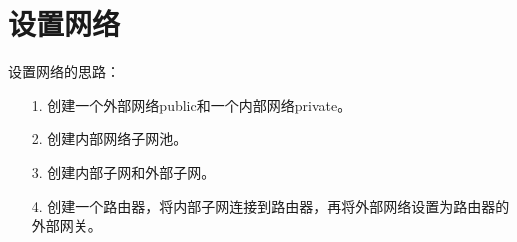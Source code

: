 \documentclass[a4paper,left=1.5cm,right=1.5cm,11pt]{article}
\begin{document}
\tableofcontents

\clearpage

\section{设置网络}

	设置网络的思路：
	\begin{itemize}
		\item[1.] 创建一个外部网络public和一个内部网络private。
		\item[2.] 创建内部网络子网池。
		\item[3.] 创建内部子网和外部子网。
		\item[4.] 创建一个路由器，将内部子网连接到路由器，再将外部网络设置为路由器的外部网关。
	\end{itemize}
\end{document}

